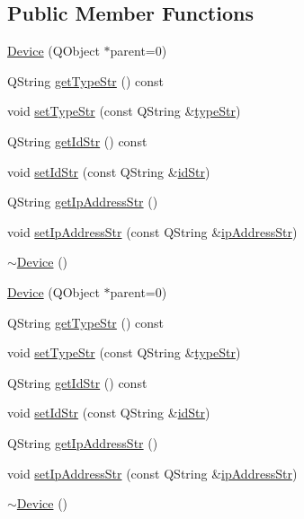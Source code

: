 \subsection*{Public Member Functions}
\begin{DoxyCompactItemize}
\item 
\hyperlink{class_device_ae17845a0781723b5a5576dbf9a5d0193}{Device} (Q\-Object $\ast$parent=0)
\item 
Q\-String \hyperlink{class_device_ab8e438ce30cd9b9a0d8f166a7b8a6865}{get\-Type\-Str} () const 
\item 
void \hyperlink{class_device_a93d4bb64ccab713b95c2157e8944170c}{set\-Type\-Str} (const Q\-String \&\hyperlink{class_device_aa89da4621bef2e58fc5e60f2733c6fe5}{type\-Str})
\item 
Q\-String \hyperlink{class_device_a0c8080fc66c84762fa3bb63120c1dd86}{get\-Id\-Str} () const 
\item 
void \hyperlink{class_device_aab4a9234e7508585559d926dd2598e95}{set\-Id\-Str} (const Q\-String \&\hyperlink{class_device_a623ee34de671f4d315dc3ebdd3b75511}{id\-Str})
\item 
Q\-String \hyperlink{class_device_ad9b878a120e3edd133d78ae4be8718a0}{get\-Ip\-Address\-Str} ()
\item 
void \hyperlink{class_device_a9bc7a46fc34c3c15c88e126208df1764}{set\-Ip\-Address\-Str} (const Q\-String \&\hyperlink{class_device_a6ff849aa48a35c19d88da2603637d989}{ip\-Address\-Str})
\item 
\hyperlink{class_device_a9dabc419c8d8df3a686c33ce042bc99a}{$\sim$\-Device} ()
\item 
\hyperlink{class_device_ae17845a0781723b5a5576dbf9a5d0193}{Device} (Q\-Object $\ast$parent=0)
\item 
Q\-String \hyperlink{class_device_ab8e438ce30cd9b9a0d8f166a7b8a6865}{get\-Type\-Str} () const 
\item 
void \hyperlink{class_device_a93d4bb64ccab713b95c2157e8944170c}{set\-Type\-Str} (const Q\-String \&\hyperlink{class_device_aa89da4621bef2e58fc5e60f2733c6fe5}{type\-Str})
\item 
Q\-String \hyperlink{class_device_a0c8080fc66c84762fa3bb63120c1dd86}{get\-Id\-Str} () const 
\item 
void \hyperlink{class_device_aab4a9234e7508585559d926dd2598e95}{set\-Id\-Str} (const Q\-String \&\hyperlink{class_device_a623ee34de671f4d315dc3ebdd3b75511}{id\-Str})
\item 
Q\-String \hyperlink{class_device_ad9b878a120e3edd133d78ae4be8718a0}{get\-Ip\-Address\-Str} ()
\item 
void \hyperlink{class_device_a9bc7a46fc34c3c15c88e126208df1764}{set\-Ip\-Address\-Str} (const Q\-String \&\hyperlink{class_device_a6ff849aa48a35c19d88da2603637d989}{ip\-Address\-Str})
\item 
\hyperlink{class_device_a9dabc419c8d8df3a686c33ce042bc99a}{$\sim$\-Device} ()
\end{DoxyCompactItemize}
